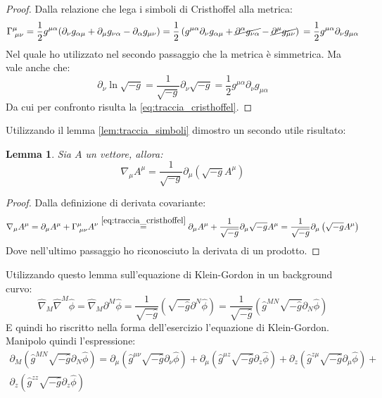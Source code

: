\documentclass[]{scrartcl}
\newtheorem{lemma}{Lemma}
\newcommand{\pd}{\partial}
\newcommand{\sg}{\sqrt{-g}}
\newcommand{\hg}{\hat{g}}
\begin{document}
\begin{proof}
  Dalla relazione che lega i simboli di Cristhoffel alla metrica:
  \[
    \Gamma^\mu_{\;\mu\nu}  = \frac{1}{2}g^{\mu\alpha} (\pd_\nu g_{\alpha\mu} + \pd_\mu g_{\nu\alpha} - \pd_\alpha g_{\mu\nu} ) \\
                          = \frac{1}{2} \left( g^{\mu\alpha} \pd_\nu g_{\alpha\mu} + \cancel{\pd^\alpha g_{\nu\alpha}} - \cancel{\pd^\mu g_{\mu\nu}} \right) \\
                          =  \frac{1}{2}g^{\mu\alpha}\pd_\nu g_{\mu\alpha}
                        \]
  Nel quale ho utilizzato nel secondo passaggio che la metrica è simmetrica.
  Ma vale anche che:
  \[
    \pd_\nu \ln \sqrt{-g} = \frac{1}{\sqrt{-g}}\pd_\nu\sqrt{-g} = \frac{1}{2}g^{\mu\alpha}\pd_\nu g_{\mu\alpha}
  \]
  Da cui per confronto risulta la \eqref{eq:traccia_cristhoffel}.
\end{proof}
\noindent
Utilizzando il lemma \ref{lem:traccia_simboli} dimostro un secondo utile risultato:
\begin{lemma}
  \label{lem:divergenza_vettore}
  Sia $ A $ un vettore, allora:
  \[
    \nabla_\mu A^\mu = \frac{1}{\sg} \pd_\mu(\sg A^\mu)
  \]
\end{lemma}
\begin{proof}
  Dalla definizione di derivata covariante:
  \begin{align*}
    \nabla_\mu A^\mu  = \pd_\mu A^\mu + \Gamma^\mu_{\;\mu\nu}A^\nu
                      \overset{\eqref{eq:traccia_cristhoffel}}{=} \pd_\mu A^\mu +  \frac{1}{\sqrt{-g}}\pd_\mu\sqrt{-g}A^\mu
                      = \frac{1}{\sqrt{-g}}\pd_\mu \left( \sqrt{-g} A^\mu \right)
  \end{align*}
  Dove nell'ultimo passaggio ho riconosciuto la derivata di un prodotto.
\end{proof}
\noindent
Utilizzando questo lemma sull'equazione di Klein-Gordon in un background curvo:
\[
  \hat{\nabla}_M \hat{\nabla}^M \hat{\phi} =  \hat{\nabla}_M \pd^M \hat{\phi} =
  \frac{1}{\sqrt{-\hg}} \left( \sqrt{-\hg}\pd^N \hat{\phi}  \right) =
  \frac{1}{\sqrt{-\hg}} \left( \hg^{MN}\sqrt{-\hg}\pd_N \hat{\phi}  \right)
\]
E quindi ho riscritto nella forma dell'esercizio l'equazione di Klein-Gordon.
Manipolo quindi l'espressione:
\begin{multline*}
  \pd_M(\hg^{MN}\sqrt{-\hg}\pd_N\hat{\phi}) =
  \pd_\mu(\hg^{\mu\nu}\sqrt{-\hg}\pd_\nu\hat{\phi}) +
  \pd_\mu(\hg^{\mu z}\sqrt{-\hg}\pd_z\hat{\phi}) +
  \pd_z(\hg^{z \mu}\sqrt{-\hg}\pd_\mu\hat{\phi}) + \\
  \pd_z(\hg^{z z}\sqrt{-\hg}\pd_z\hat{\phi})
\end{multline*}
\end{document}
